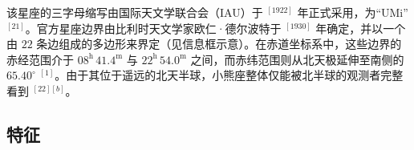 该星座的三字母缩写由国际天文学联合会（IAU）于 $^{[1922]}$ 年正式采用，为“UMi”$^{[21]}$。官方星座边界由比利时天文学家欧仁·德尔波特于 $^{[1930]}$ 年确定，并以一个由 $22$ 条边组成的多边形来界定（见信息框示意）。在赤道坐标系中，这些边界的赤经范围介于 $08^\mathrm{h}\,41.4^\mathrm{m}$ 与 $22^\mathrm{h}\,54.0^\mathrm{m}$ 之间，而赤纬范围则从北天极延伸至南侧的 $65.40^\circ$ $^{[1]}$。由于其位于遥远的北天半球，小熊座整体仅能被北半球的观测者完整看到 $^{[22][b]}$。
\subsection{特征}
